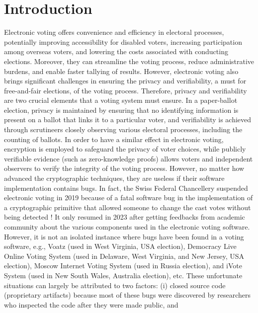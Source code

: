\documentclass[conference,compsoc]{IEEEtran}
\begin{document}
\section{Introduction}
Electronic voting offers convenience and efficiency in electoral processes, potentially improving 
accessibility for disabled voters, increasing participation among overseas voters, and lowering 
the costs associated with conducting elections. Moreover,
they can streamline the voting process, reduce administrative burdens, and enable 
faster tallying of results. However, electronic voting also brings significant 
challenges in ensuring the privacy and verifiability, a must for free-and-fair elections, of the voting process. Therefore, 
privacy and verifiability are two crucial elements that a voting system must ensure.
In a paper-ballot election, privacy is maintained by 
ensuring that no identifying information is present on a ballot that links it to a particular voter, 
and verifiability is achieved through scrutineers closely observing various electoral processes, 
including the counting of ballots. In order to have a similar effect in electronic voting, encryption 
is employed to safeguard the privacy of voter choices, while publicly verifiable evidence 
(such as zero-knowledge proofs) allows voters and independent observers to verify the integrity of 
the voting process. However, no matter how advanced the cryptographic techniques, they are useless 
if their software implementation contains bugs. In fact, 
the Swiss Federal Chancellery suspended electronic voting in 2019 because of 
a fatal software bug in the implementation of a cryptographic primitive 
that allowed someone to change the cast votes without being detected \cite{9152765}!
It only resumed in 2023 after getting feedbacks from academic 
community \cite{swiss_evoting_chronik} about the various components used in 
the electronic voting software. However, it is not an isolated  
instance where bugs have been found in a voting software, e.g., 
Voatz \cite{255334} (used in West Virginia, USA election),
Democracy Live Online Voting System \cite{263858} 
(used in Delaware, West Virginia, and New Jersey, USA election), 
Moscow Internet Voting System \cite{10.1007/978-3-030-51280-4_3}
(used in Russia election), and iVote System \cite{10.1007/978-3-319-22270-7_3, 10.1145/3014812.3014837} 
(used in New South Wales, Australia election), etc. 
These unfortunate situations can largely be attributed to two factors: 
(i) closed source code (proprietary artifacts) because most of these bugs were 
discovered by researchers who inspected the code after they were made public, and 
\end{document}
